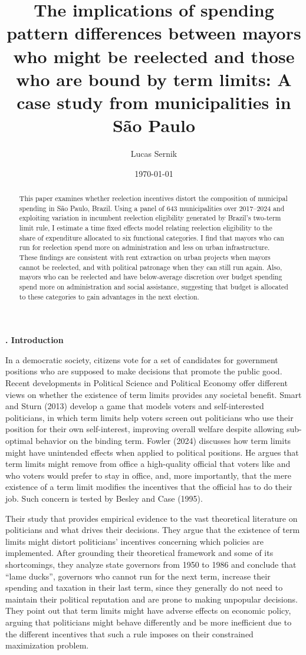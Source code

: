 \documentclass[12pt, a4paper]{article}
\author{Lucas Sernik}
\title{The implications of spending pattern differences between mayors who might be reelected and those who are bound by term limits: A case study from municipalities in São Paulo}
\date{\today}
\newcounter{headercounter}
\newcommand{\header}[1]{\begin{center}{\large \textbf{\Roman{headercounter}. #1}} \end{center} \stepcounter{headercounter}}
\begin{document}
\maketitle

\begin{abstract}
This paper examines whether reelection incentives distort the composition of municipal spending in São Paulo, Brazil. Using a panel of 643 municipalities over 2017--2024 and exploiting variation in incumbent reelection eligibility generated by Brazil's two-term limit rule, I estimate a time fixed effects model relating reelection eligibility to the share of expenditure allocated to six functional categories. I find that mayors who can run for reelection spend more on administration and less on urban infrastructure. These findings are consistent with rent extraction on urban projects when mayors cannot be reelected, and with political patronage when they can still run again. Also, mayors who can be reelected and have below-average discretion over budget spending spend more on administration and social assistance, suggesting that budget is allocated to these categories to gain advantages in the next election.
\end{abstract}

\newpage

\header{Introduction}

In a democratic society, citizens vote for a set of candidates for government positions who are supposed to make decisions that promote the public good. Recent developments in Political Science and Political Economy offer different views on whether the existence of term limits provides any societal benefit. Smart and Sturn (2013) develop a game that models voters and self-interested politicians, in which term limits help voters screen out politicians who use their position for their own self-interest, improving overall welfare despite allowing sub-optimal behavior on the binding term. Fowler (2024) discusses how term limits might have unintended effects when applied to political positions. He argues that term limits might remove from office a high-quality official that voters like and who voters would prefer to stay in office, and, more importantly, that the mere existence of a term limit modifies the incentives that the official has to do their job. Such concern is tested by Besley and Case (1995). 

Their study that provides empirical evidence to the vast theoretical literature on politicians and what drives their decisions. They argue that the existence of term limits might distort politicians' incentives concerning which policies are implemented. After grounding their theoretical framework and some of its shortcomings, they analyze state governors from 1950 to 1986 and conclude that ``lame ducks'', governors who cannot run for the next term, increase their spending and taxation in their last term, since they generally do not need to maintain their political reputation and are prone to making unpopular decisions. They point out that term limits might have adverse effects on economic policy, arguing that politicians might behave differently and be more inefficient due to the different incentives that such a rule imposes on their constrained maximization problem.
\end{document}

